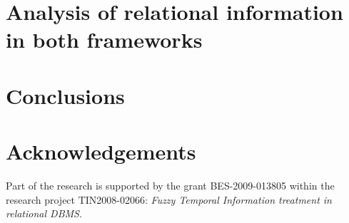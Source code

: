\documentclass[twocolumn,a4paper]{article}
\theoremstyle{definition}
\begin{document}
\section{\label{sec:proposal}Analysis of relational information in both frameworks}


\section{\label{sec:conclusions}Conclusions}


\section*{Acknowledgements}
Part of the research is supported by the grant BES-2009-013805 within the research project TIN2008-02066: \emph{Fuzzy Temporal Information treatment in relational DBMS}.
\end{document}
